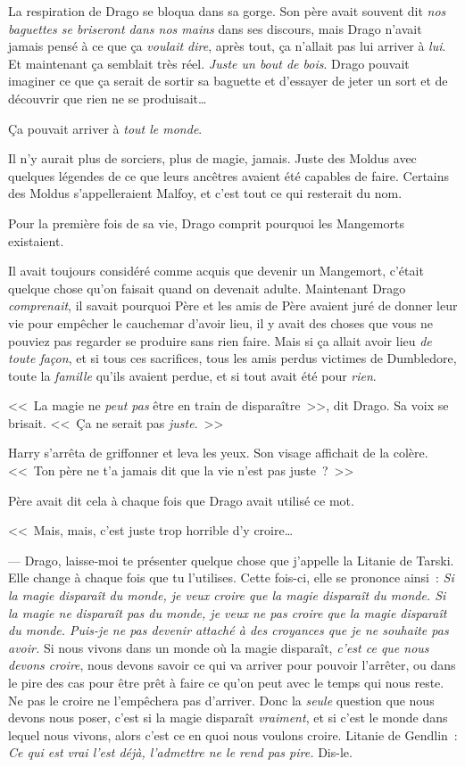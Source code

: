 La respiration de Drago se bloqua dans sa gorge. Son père avait souvent dit \emph{nos baguettes se briseront dans nos mains} dans ses discours, mais Drago n'avait jamais pensé à ce que ça \emph{voulait dire}, après tout, ça n'allait pas lui arriver à \emph{lui}. Et maintenant ça semblait très réel. \emph{Juste un bout de bois}. Drago pouvait imaginer ce que ça serait de sortir sa baguette et d'essayer de jeter un sort et de découvrir que rien ne se produisait…

Ça pouvait arriver à \emph{tout le monde}.

Il n'y aurait plus de sorciers, plus de magie, jamais. Juste des Moldus avec quelques légendes de ce que leurs ancêtres avaient été capables de faire. Certains des Moldus s'appelleraient Malfoy, et c'est tout ce qui resterait du nom.

Pour la première fois de sa vie, Drago comprit pourquoi les Mangemorts existaient.

Il avait toujours considéré comme acquis que devenir un Mangemort, c'était quelque chose qu'on faisait quand on devenait adulte. Maintenant Drago \emph{comprenait}, il savait pourquoi Père et les amis de Père avaient juré de donner leur vie pour empêcher le cauchemar d'avoir lieu, il y avait des choses que vous ne pouviez pas regarder se produire sans rien faire. Mais si ça allait avoir lieu \emph{de toute façon}, et si tous ces sacrifices, tous les amis perdus victimes de Dumbledore, toute la \emph{famille} qu'ils avaient perdue, et si tout avait été pour \emph{rien}.

<<~La magie ne \emph{peut pas} être en train de disparaître~>>, dit Drago. Sa voix se brisait. <<~Ça ne serait pas \emph{juste}.~>>

Harry s'arrêta de griffonner et leva les yeux. Son visage affichait de la colère. <<~Ton père ne t'a jamais dit que la vie n'est pas juste~?~>>

Père avait dit cela à chaque fois que Drago avait utilisé ce mot.

<<~Mais, mais, c'est juste trop horrible d'y croire…

--- Drago, laisse-moi te présenter quelque chose que j'appelle la Litanie de Tarski. Elle change à chaque fois que tu l'utilises. Cette fois-ci, elle se prononce ainsi~: \emph{Si la magie disparaît du monde, je veux croire que la magie disparaît du monde. Si la magie ne disparaît pas du monde, je veux ne pas croire que la magie disparaît du monde. Puis-je ne pas devenir attaché à des croyances que je ne souhaite pas avoir.} Si nous vivons dans un monde où la magie disparaît, \emph{c'est ce que nous devons croire}, nous devons savoir ce qui va arriver pour pouvoir l'arrêter, ou dans le pire des cas pour être prêt à faire ce qu'on peut avec le temps qui nous reste. Ne pas le croire ne l'empêchera pas d'arriver. Donc la \emph{seule} question que nous devons nous poser, c'est si la magie disparaît \emph{vraiment}, et si c'est le monde dans lequel nous vivons, alors c'est ce en quoi nous voulons croire. Litanie de Gendlin~: \emph{Ce qui est vrai l'est déjà, l'admettre ne le rend pas pire.} Dis-le.

